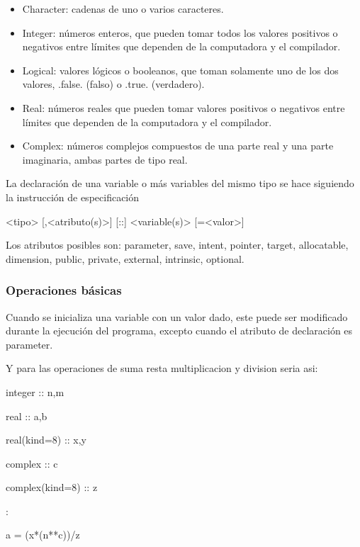 \begin{itemize}
\item Character: cadenas de uno o varios caracteres.
\item Integer: números enteros, que pueden tomar todos los valores positivos o negativos entre límites que dependen de la computadora y el compilador.
\item Logical: valores lógicos o booleanos, que toman solamente uno de los dos valores, .false. (falso) o .true. (verdadero).
\item Real: números reales que pueden tomar valores positivos o negativos entre límites que dependen de la computadora y el compilador.
\item Complex: números complejos compuestos de una parte real y una parte imaginaria, ambas partes de tipo real.
\end{itemize}

La declaración de una variable o más variables del mismo tipo se hace siguiendo la instrucción de especificación

<tipo> [,<atributo(s)>] [::] <variable(s)> [=<valor>]

Los atributos posibles son:
parameter, save, intent, pointer, target, allocatable, dimension, public, private, external, intrinsic, optional.

\subsubsection{Operaciones básicas}

Cuando se inicializa una variable con un valor dado, este puede ser modificado durante la ejecución del programa, excepto cuando el atributo de declaración es parameter.

Y para las operaciones de suma resta multiplicacion y division seria asi:

\hspace{2cm}integer :: n,m

\hspace{2cm}real :: a,b

\hspace{2cm}real(kind=8) :: x,y

\hspace{2cm}complex :: c

\hspace{2cm}complex(kind=8) :: z

\hspace{2cm}:

\hspace{2cm}a = (x*(n**c))/z

